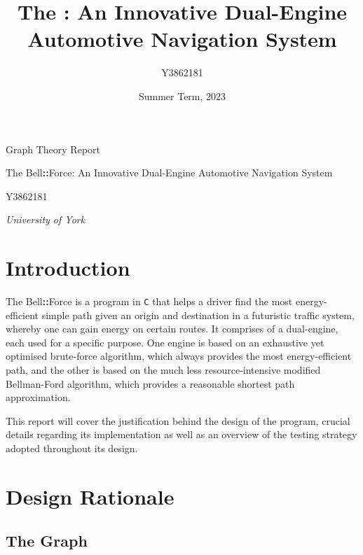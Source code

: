 \documentclass[11pt]{article}
\title{The \bellforce{}: An Innovative Dual-Engine Automotive Navigation System }
\author{Y3862181}
\date{Summer Term, 2023}
\newcommand{\bellforce}{Bell\hspace*{1.61803398875pt}\textbf{::}\hspace*{1.61803398875pt}Force}
\begin{document}
\begin{titlepage}
\centering
{\Huge Graph Theory Report}

\vspace{3cm}

\LARGE {The \bellforce{}: An Innovative Dual-Engine Automotive Navigation System}

\vspace{3cm}

{\LARGE Y3862181}

\vspace{2cm}



\vfill

{\itshape University of York}
\end{titlepage}

\titlepage
\tableofcontents

\pagestyle{content}
\maketitle

\section{Introduction}
\noindent
The \bellforce{} is a program in \texttt{C} that helps a driver find the most energy-efficient simple path given an origin and destination in a futuristic traffic system, whereby one can gain energy on certain routes. It comprises of a dual-engine, each used for a specific purpose. One engine is based on an exhaustive yet optimised brute-force algorithm, which always provides the most energy-efficient path, and the other is based on the much less resource-intensive modified Bellman-Ford algorithm, which provides a reasonable shortest path approximation.

This report will cover the justification behind the design of the program, crucial details regarding its implementation as well as an overview of the testing strategy adopted throughout its design.


\section{Design Rationale}
\subsection{The Graph}
\end{document}
